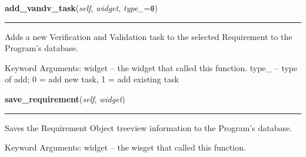 \hspace{.8\funcindent}\begin{boxedminipage}{\funcwidth}

    \raggedright \textbf{add\_vandv\_task}(\textit{self}, \textit{widget}, \textit{type\_}={\tt 0})

    \vspace{-1.5ex}

    \rule{\textwidth}{0.5\fboxrule}
\setlength{\parskip}{2ex}
    Adds a new Verification and Validation task to the selected Requirement
    to the Program's database.

    Keyword Arguments: widget -- the widget that called this function. 
    type\_  -- type of add; 0 = add new task, 1 = add existing task

\setlength{\parskip}{1ex}
    \end{boxedminipage}

    \label{reliafree:requirement:Requirement:save_requirement}

    \vspace{0.5ex}

\hspace{.8\funcindent}\begin{boxedminipage}{\funcwidth}

    \raggedright \textbf{save\_requirement}(\textit{self}, \textit{widget})

    \vspace{-1.5ex}

    \rule{\textwidth}{0.5\fboxrule}
\setlength{\parskip}{2ex}
    Saves the Requirement Object treeview information to the Program's 
    database.

    Keyword Arguments: widget -- the wisget that called this function.

\setlength{\parskip}{1ex}
    \end{boxedminipage}

    \label{reliafree:requirement:Requirement:save_vandv_tasks}

    \vspace{0.5ex}

